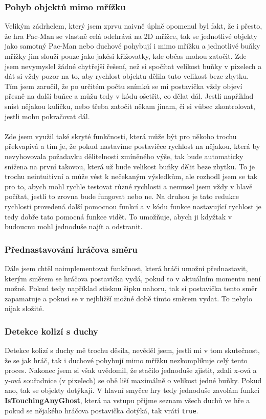 \documentclass[a4]{article}
\begin{document}
\subsubsection{Pohyb objektů mimo mřížku}
Velikým zádrhelem, který jsem zprvu naivně úplně opomenul byl fakt, že i přesto, že hra Pac-Man se vlastně celá odehrává na 2D mřížce, tak se jednotlivé objekty jako samotný Pac-Man nebo duchové pohybují i mimo mřížku a jednotlivé buňky mřížky jim slouží pouze jako jakési křižovatky, kde občas mohou zatočit. Zde jsem nevymyslel žádné chytřejší řešení, než si spočítat velikost buňky v pixelech a dát si vždy pozor na to, aby rychlost objektu dělila tuto velikost beze zbytku. Tím jsem zaručil, že po určitém počtu snímků se mi postavička vždy objeví přesně na další buňce a můžu tedy v kódu ošetřit, co dělat dál. Jestli například sníst nějakou kuličku, nebo třeba zatočit někam jinam, či si vůbec zkontrolovat, jestli mohu pokračovat dál.
\\\\
Zde jsem využil také skryté funkčnosti, která může být pro někoho trochu překvapivá a tím je, že pokud nastavíme postavičce rychlost na nějakou, která by nevyhovovala požadavku dělitelnosti zmíněného výše, tak bude automaticky snížena na první takovou, která už bude velikost buňky dělit beze zbytku. To je trochu neintuitivní a může vést k nečekaným výsledkům, ale rozhodl jsem se tak pro to, abych mohl rychle testovat různé rychlosti a nemusel jsem vždy v hlavě počítat, jestli to zrovna bude fungovat nebo ne. Na druhou je tato redukce rychlosti provedená další pomocnou funkcí a v kódu funkce nastavující rychlost je tedy dobře tato pomocná funkce vidět. To umožňuje, abych ji kdyžtak v budoucnu mohl jednoduše najít a odstranit.
\subsubsection{Přednastavování hráčova směru}
Dále jsem chtěl naimplementovat funkčnost, která hráči umožní přednastavit, kterým směrem se hráčova postavička vydá, pokud to v aktuálním momentu není možné. Pokud tedy například stisknu šipku nahoru, tak si postavička tento směr zapamatuje a pokusí se v nejbližší možné době tímto směrem vydat. To nebylo nijak složité.
\subsubsection{Detekce kolizí s duchy}
Detekce kolizí s duchy mě trochu děsila, nevěděl jsem, jestli mi v tom skutečnost, že se jak hráč, tak i duchové pohybují mimo mřížku nezkomplikuje celý tento proces. Nakonec jsem si však uvědomil, že stačilo jednoduše zjistit, zdali x-ová a y-ová souřadnice (v pixelech) se obě liší maximálně o velikost jedné buňky. Pokud ano, tak se objekty dotýkají. V hlavní smyčce hry tedy jednoduše zavolám funkci \textbf{IsTouchingAnyGhost}, která na vstupu přijme seznam všech duchů ve hře a pokud se nějakého hráčova postavička dotýká, tak vrátí \verb|true|.
\end{document}
